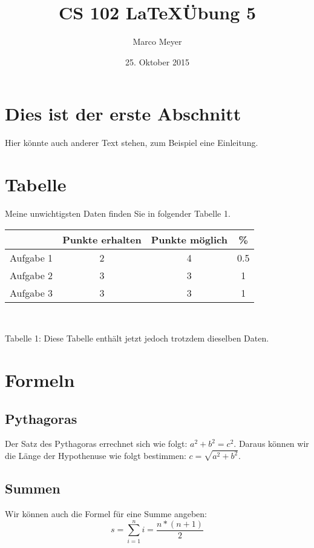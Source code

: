 \documentclass{article}
\author{Marco Meyer}
\title{CS 102 \LaTeX  \"Ubung 5}
\date{25. Oktober 2015}
\begin{document}
\maketitle
\section{Dies ist der erste Abschnitt}
Hier k\"onnte auch anderer Text stehen, zum Beispiel eine Einleitung.

\section{Tabelle}
Meine unwichtigsten Daten finden Sie in folgender Tabelle 1.\\

\begin{tabular}[c]{c|c|c|c}

 & Punkte erhalten & Punkte m\"oglich & \%\\
\hline
Aufgabe 1 & 2 & 4 &0.5 \\
Aufgabe 2 & 3 & 3 &1\\
Aufgabe 3 & 3 & 3 &1 \\

\end{tabular} \\
\begin{center}
Tabelle 1: Diese Tabelle enthält jetzt jedoch trotzdem dieselben Daten.
\end{center} 

\section{Formeln}
\subsection{Pythagoras}
Der Satz des Pythagoras errechnet sich wie folgt: $ a^{2}+b^{2}=c^{2} $. Daraus k\"onnen wir die L\"ange der Hypothenuse wie folgt bestimmen: $ c=\sqrt{a^{2}+b^{2}} $.
\subsection{Summen}
Wir k\"onnen auch die Formel f\"ur eine Summe angeben:\\ 
\begin{equation}
	s=\sum_{i=1}^n i=\frac{n*(n+1)}{2}
	\label{eq:formel}
\end{equation} 
\end{document}

